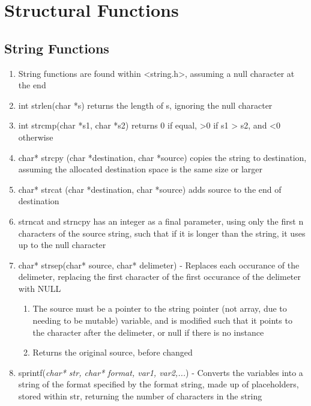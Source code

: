 \documentclass[11 pt, twoside]{article}
\begin{document}
\section{Structural Functions}
\subsection{String Functions}
\begin{enumerate}
\item String functions are found within <string.h>, assuming a null character at the end
\item int strlen(char *s) returns the length of s, ignoring the null character
\item int strcmp(char *s1, char *s2) returns 0 if equal, >0 if s1 > s2, and <0 otherwise
\item char* strcpy (char *destination, char *source) copies the string to destination, assuming the allocated destination space is the same size or larger
\item char* strcat (char *destination, char *source) adds source to the end of destination
\item strncat and strncpy has an integer as a final parameter, using only the first n characters of the source string, such that if it is longer than the string, it uses up to the null character 
\item char* strsep(char* source, char* delimeter) - Replaces each occurance of the delimeter, replacing the first character of the first occurance of the delimeter with NULL
\begin{enumerate}
\item The source must be a pointer to the string pointer (not array, due to needing to be mutable) variable, and is modified such that it points to the character after the delimeter, or null if there is no instance
\item Returns the original source, before changed
\end{enumerate}
\item sprintf(\textit{char* str, char* format, var1, var2,...}) - Converts the variables into a string of the format specified by the format string, made up of placeholders, stored within str, returning the number of characters in the string 
\end{enumerate}
\end{document}

